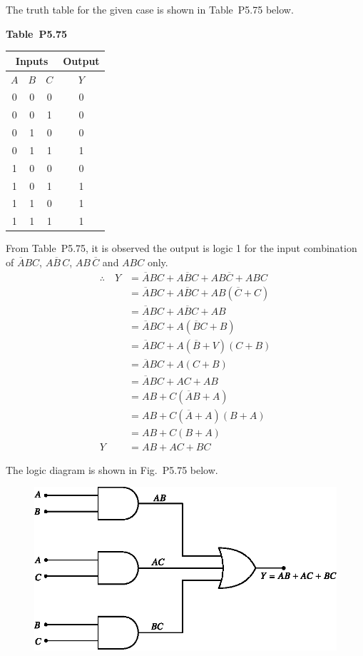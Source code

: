 \begin{solution}
The truth table for the given case is shown in Table~P5.75 below.
\begin{table}[H]
\centering
{\bf Table~P5.75}
\medskip

\renewcommand{\arraystretch}{1.35}
\tabcolsep=10pt
\begin{tabular}{|c|c|c|c|}
\hline
\multicolumn{3}{|c|}{\bf Inputs} & {\bf Output}\\
\hline
\boldmath$A$ & \boldmath$B$ & \boldmath$C$ & \boldmath$Y$\\
\hline
0 & 0 & 0 & 0\\
0 & 0 & 1 & 0\\
0 & 1 & 0 & 0\\
0 & 1 & 1 & 1\\
1 & 0 & 0 & 0\\
1 & 0 & 1 & 1\\
1 & 1 & 0 & 1\\
1 & 1 & 1 & 1\\
\hline
\end{tabular}
\end{table}

\eject

From Table~P5.75, it is observed the output is logic 1 for the input combination of $\overline{A}BC$, $A\overline{B}\,C$, $AB\,\overline{C}$ and $ABC$ only.
\begin{align*}
\therefore\quad Y &= \overline{A}BC + A\overline{B}C + AB\overline{C} + ABC\\[4pt]
 &= \overline{A}BC + A\overline{B}C+ AB(\overline{C}+C)\\[4pt]
 &= \overline{A}BC+A\overline{B}C+AB\\[4pt]
 &= \overline{A}BC+A(\overline{B}C+B)\\[4pt]
 &= \overline{A}BC+A(\overline{B}+V)(C+B)\\[4pt]
 &= \overline{A}BC+A(C+B)\\[4pt]
 &= \overline{A}BC+AC+AB\\[4pt]
 &= AB+C(\overline{A}B+A)\\[4pt]
 &= AB+C(\overline{A}+A)(B+A)\\[4pt]
 &= AB+C(B+A)\\[4pt]
Y &= AB+AC+BC
\end{align*}

The logic diagram is shown in Fig.~P5.75 below.
\begin{figure}[H]
\centering
\includegraphics{chap5/figP5.72.eps}


\end{figure}
\end{solution}
